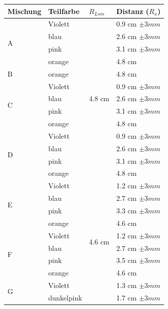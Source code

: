\documentclass[11pt,paper=a4,final]{scrartcl}
\begin{document}
\begin{savenotes}
  \begin{table}[ht!]
    \centering
    \begin{tabular}{|l|l|l|l|}
      \hline
      \bf Mischung	& \bf Teilfarbe	& \bf \(R_{Lsm}\)		& \bf Distanz (\(R_x\))	\\ \hline
      \multirow{4}{*}{A}
			& Violett	& \multirow{13}{*}{4.8 cm }	& 0.9 cm \(\pm 3 mm \)	\\
      			& blau		& 				& 2.6 cm \(\pm 3 mm \)	\\
      			& pink		&				& 3.1 cm \(\pm 3 mm \)	\\
      			& orange	&				& 4.8 cm 		\\ \cline{1-2} \cline{4-4}
       B		& orange	&				& 4.8 cm		\\ \cline{1-2} \cline{4-4}
      \multirow{4}{*}{C}
			& Violett	& 				& 0.9 cm \(\pm 3 mm \)	\\
      			& blau		& 				& 2.6 cm \(\pm 3 mm \)	\\
      			& pink		&				& 3.1 cm \(\pm 3 mm \)	\\
      			& orange	&				& 4.8 cm 		\\ \cline{1-2} \cline{4-4}
      \multirow{4}{*}{D}
			& Violett	&				& 0.9 cm \(\pm 3 mm \)	\\
      			& blau		& 				& 2.6 cm \(\pm 3 mm \)	\\
      			& pink		&				& 3.1 cm \(\pm 3 mm \)	\\
      			& orange	&				& 4.8 cm 		\\ \hline
      \multirow{4}{*}{E}
			& Violett	& \multirow{18}{*}{4.6 cm }	& 1.2 cm \(\pm 3 mm \)	\\
      			& blau		& 				& 2.7 cm \(\pm 3 mm \)	\\
      			& pink		&				& 3.3 cm \(\pm 3 mm \)	\\
			      & orange	&				& 4.6 cm 		\\ \cline{1-2} \cline{4-4}
      \multirow{4}{*}{F}
			& Violett	&				& 1.2 cm \(\pm 3 mm \)	\\
      			& blau		& 				& 2.7 cm \(\pm 3 mm \)	\\
      			& pink		&				& 3.5 cm \(\pm 3 mm \)	\\
			& orange	&				& 4.6 cm 		\\ \cline{1-2} \cline{4-4}
      \multirow{5}{*}{G}
			& Violett	&				& 1.3 cm \(\pm 3 mm \)	\\
      			& dunkelpink 	&				& 1.7 cm \(\pm 3 mm \)	\\

\end{tabular}
\end{table}
\end{savenotes}
\end{document}
